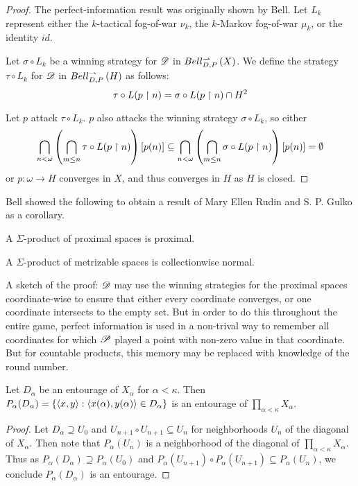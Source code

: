 \begin{proof}
  The perfect-information result was originally shown by Bell.
  Let $L_k$ represent either the $k$-tactical fog-of-war $\nu_k$,
  the $k$-Markov fog-of-war $\mu_k$, or the identity $id$.

  Let $\sigma\circ L_k$ be a winning strategy for $\mathscr{D}$ in $Bell_{D,P}^{\rightharpoonup}\left({X}\right)$.
  We define the strategy $\tau\circ L_k$ for $\mathscr{D}$ in $Bell_{D,P}^{\rightharpoonup}\left({H}\right)$ as
  follows:
    \[
      \tau\circ L(p\restriction n)
        =
      \sigma\circ L(p\restriction n)
        \cap
      H^2
    \]

  Let $p$ attack $\tau\circ L_k$. $p$ also attacks the winning strategy
  $\sigma\circ L_k$, so either
    \[
      \bigcap_{n<\omega}
      \left(\bigcap_{m\leq n}\tau\circ L(p\restriction n)\right)
      [p(n)]
        \subseteq
      \bigcap_{n<\omega}
      \left(\bigcap_{m\leq n}\sigma\circ L(p\restriction n)\right)
      [p(n)]
        =
      \emptyset
    \]
  or $p:\omega\to H$ converges in $X$, and thus converges in $H$ as $H$ is
  closed.
\end{proof}

Bell showed the following to obtain a result of Mary Ellen Rudin \cite{MR716576}
and S. P. Gulko \cite{MR0461410} as a corollary.

\begin{thm}
  A $\Sigma$-product of proximal spaces is proximal.
\end{thm}

\begin{cor}
  A $\Sigma$-product of metrizable spaces is collectionwise normal.
\end{cor}

A sketch of the proof: $\mathscr{D}$ may use the winning strategies for the
proximal spaces coordinate-wise to ensure that either every coordinate
converges, or one coordinate intersects to the empty set. But in order to do
this throughout the entire game, perfect information is used in a non-trival
way to remember all coordinates for which $\mathscr{P}$ played a point with
non-zero value in that coordinate. But for countable products, this memory
may be replaced with knowledge of the round number.

\begin{lem}
  Let $D_\alpha$ be an entourage of $X_\alpha$ for $\alpha<\kappa$. Then
  $P_\alpha(D_\alpha)=\{\langle x,y\rangle:\langle x(\alpha),y(\alpha)\rangle\in D_\alpha\}$
  is an entourage of $\prod_{\alpha<\kappa} X_\alpha$.
\end{lem}

\begin{proof}
  Let $D_\alpha\supseteq U_0$ and $U_{n+1}\circ U_{n+1}\subseteq U_n$ for
  neighborhoods $U_n$ of the diagonal of $X_\alpha$. Then note that
  $P_\alpha(U_{n})$ is a neighborhood of the diagonal of
  $\prod_{\alpha<\kappa} X_\alpha$. Thus as
  $P_\alpha(D_\alpha) \supseteq P_\alpha(U_0)$ and
  $P_\alpha(U_{n+1})\circ P_\alpha(U_{n+1})\subseteq P_\alpha(U_{n})$,
  we conclude $P_\alpha(D_\alpha)$ is an entourage.
\end{proof}


